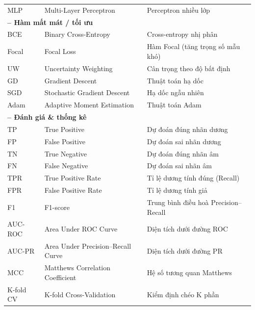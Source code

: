 \begin{longtable}{@{}p{2.5cm} p{6.5cm} p{5.5cm}@{}}
MLP      & Multi-Layer Perceptron                   & Perceptron nhiều lớp \\[3pt]

\multicolumn{3}{l}{\textbf{– Hàm mất mát / tối ưu}}\\
BCE      & Binary Cross-Entropy                     & Cross-entropy nhị phân \\
Focal    & Focal Loss                               & Hàm Focal (tăng trọng số mẫu khó) \\
UW       & Uncertainty Weighting                    & Cân trọng theo độ bất định \\
GD       & Gradient Descent                         & Thuật toán hạ dốc \\
SGD      & Stochastic Gradient Descent              & Hạ dốc ngẫu nhiên \\
Adam     & Adaptive Moment Estimation               & Thuật toán Adam \\[3pt]

\multicolumn{3}{l}{\textbf{– Đánh giá \& thống kê}}\\
TP       & True Positive                            & Dự đoán đúng nhãn dương \\
FP       & False Positive                           & Dự đoán sai nhãn dương \\
TN       & True Negative                            & Dự đoán đúng nhãn âm \\
FN       & False Negative                           & Dự đoán sai nhãn âm \\
TPR      & True Positive Rate                       & Tỉ lệ dương tính đúng (Recall) \\
FPR      & False Positive Rate                      & Tỉ lệ dương tính giả \\
F1       & F1-score                                 & Trung bình điều hoà Precision–Recall \\
AUC-ROC  & Area Under ROC Curve                     & Diện tích dưới đường ROC \\
AUC-PR   & Area Under Precision–Recall Curve        & Diện tích dưới đường PR \\
MCC      & Matthews Correlation Coefficient         & Hệ số tương quan Matthews \\
K-fold CV& K-fold Cross-Validation                  & Kiểm định chéo K phần \\[3pt]


\end{longtable}

